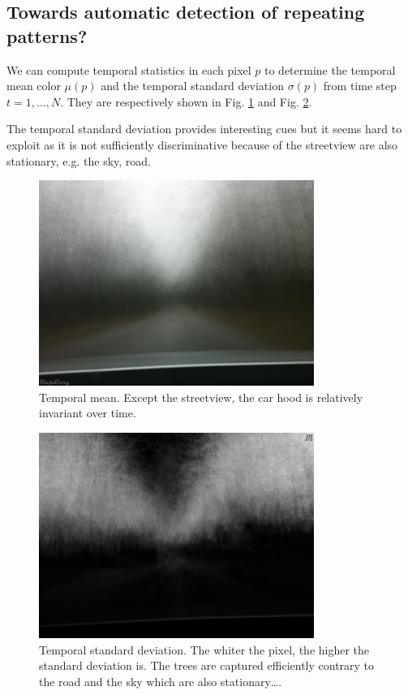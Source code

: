 \documentclass[a4paper,twoside,10pt]{article}
\begin{document}
\subsection{Towards automatic detection of repeating patterns?}

We can compute temporal statistics in each pixel $p$ to determine the temporal mean color $\mu(p)$ and the temporal standard deviation $\sigma(p)$ from time step $t=1,\dots,N$. They are respectively shown in Fig. \ref{fig:mean_image} and Fig. \ref{fig:std_dev_image}.

The temporal standard deviation provides interesting cues but it seems hard to exploit as it is not sufficiently discriminative because of the streetview are also stationary, e.g. the sky, road.

\begin{figure}
	\centering
  \includegraphics[width=0.8\textwidth]{mean_image.png}
	\caption{Temporal mean. Except the streetview, the car hood is relatively invariant over time.}
	\label{fig:mean_image}
\end{figure}

\begin{figure}
  \centering
  \includegraphics[width=0.8\textwidth]{std_dev_image.png}
	\caption{Temporal standard deviation. The whiter the pixel, the higher the standard deviation is. The trees are captured efficiently contrary to the road and the sky which are also stationary\dots.}
	\label{fig:std_dev_image}
\end{figure}
\end{document}
